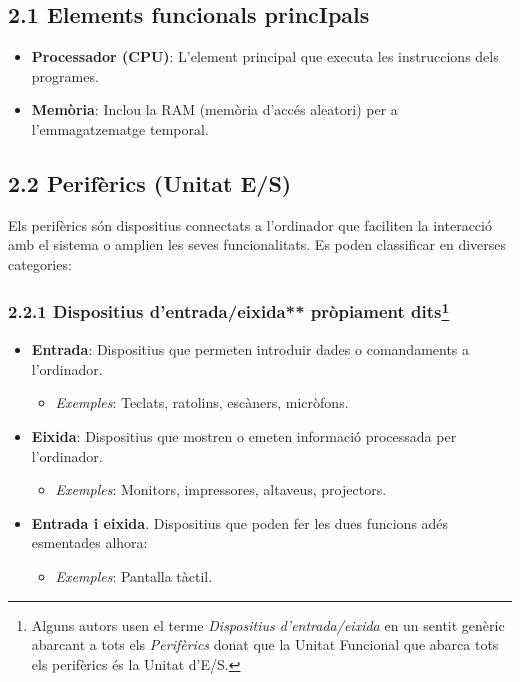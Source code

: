 \documentclass[
  12 pt,
  a4paper,
]{article}
\providecommand{\tightlist}{%
  \setlength{\itemsep}{0pt}\setlength{\parskip}{0pt}}
\begin{document}
\subsection{2.1 Elements funcionals
princIpals}\label{elements-funcionals-principals}

\begin{itemize}
\tightlist
\item
  \textbf{Processador (CPU)}: L'element principal que executa les
  instruccions dels programes.
\item
  \textbf{Memòria}: Inclou la RAM (memòria d'accés aleatori) per a
  l'emmagatzematge temporal.
\end{itemize}

\subsection{2.2 Perifèrics (Unitat E/S)}\label{perifuxe8rics-unitat-es}

Els perifèrics són dispositius connectats a l'ordinador que faciliten la
interacció amb el sistema o amplien les seves funcionalitats. Es poden
classificar en diverses categories:

\subsubsection[2.2.1 Dispositius d'entrada/eixida** pròpiament
dits]{\texorpdfstring{2.2.1 Dispositius d'entrada/eixida** pròpiament
dits\footnote{Alguns autors usen el terme \emph{Dispositius
  d'entrada/eixida} en un sentit genèric abarcant a tots els
  \emph{Perifèrics} donat que la Unitat Funcional que abarca tots els
  perifèrics és la Unitat d'E/S.}}{2.2.1 Dispositius d'entrada/eixida** pròpiament dits}}\label{dispositius-dentradaeixida-pruxf2piament-dits1}

\begin{itemize}
\tightlist
\item
  \textbf{Entrada}: Dispositius que permeten introduir dades o
  comandaments a l'ordinador.

  \begin{itemize}
  \tightlist
  \item
    \emph{Exemples}: Teclats, ratolins, escàners, micròfons.
  \end{itemize}
\item
  \textbf{Eixida}: Dispositius que mostren o emeten informació
  processada per l'ordinador.

  \begin{itemize}
  \tightlist
  \item
    \emph{Exemples}: Monitors, impressores, altaveus, projectors.
  \end{itemize}
\item
  \textbf{Entrada i eixida}. Dispositius que poden fer les dues funcions
  adés esmentades alhora:

  \begin{itemize}
  \tightlist
  \item
    \emph{Exemples}: Pantalla tàctil.
  \end{itemize}
\end{itemize}
\end{document}
